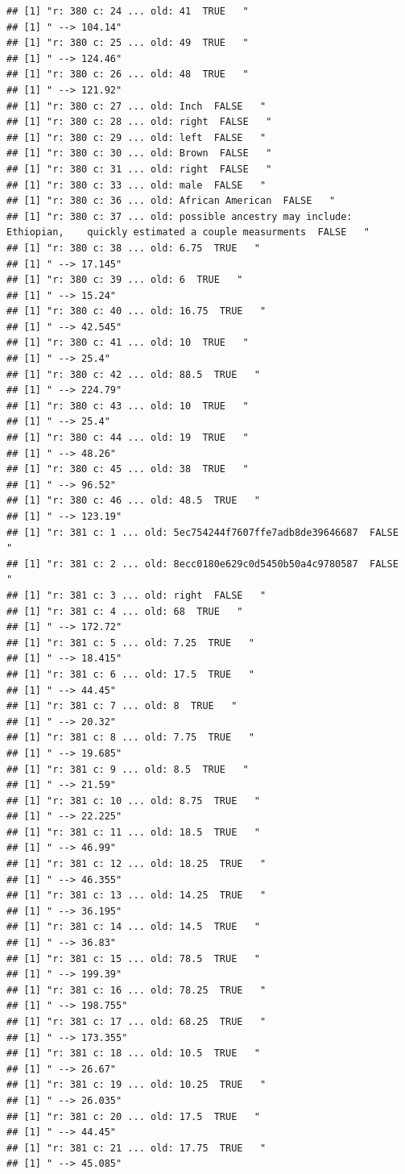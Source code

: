 \documentclass[]{article}
\begin{document}
\begin{verbatim}
## [1] "r: 380 c: 24 ... old: 41  TRUE   "
## [1] " --> 104.14"
## [1] "r: 380 c: 25 ... old: 49  TRUE   "
## [1] " --> 124.46"
## [1] "r: 380 c: 26 ... old: 48  TRUE   "
## [1] " --> 121.92"
## [1] "r: 380 c: 27 ... old: Inch  FALSE   "
## [1] "r: 380 c: 28 ... old: right  FALSE   "
## [1] "r: 380 c: 29 ... old: left  FALSE   "
## [1] "r: 380 c: 30 ... old: Brown  FALSE   "
## [1] "r: 380 c: 31 ... old: right  FALSE   "
## [1] "r: 380 c: 33 ... old: male  FALSE   "
## [1] "r: 380 c: 36 ... old: African American  FALSE   "
## [1] "r: 380 c: 37 ... old: possible ancestry may include: Ethiopian,    quickly estimated a couple measurments  FALSE   "
## [1] "r: 380 c: 38 ... old: 6.75  TRUE   "
## [1] " --> 17.145"
## [1] "r: 380 c: 39 ... old: 6  TRUE   "
## [1] " --> 15.24"
## [1] "r: 380 c: 40 ... old: 16.75  TRUE   "
## [1] " --> 42.545"
## [1] "r: 380 c: 41 ... old: 10  TRUE   "
## [1] " --> 25.4"
## [1] "r: 380 c: 42 ... old: 88.5  TRUE   "
## [1] " --> 224.79"
## [1] "r: 380 c: 43 ... old: 10  TRUE   "
## [1] " --> 25.4"
## [1] "r: 380 c: 44 ... old: 19  TRUE   "
## [1] " --> 48.26"
## [1] "r: 380 c: 45 ... old: 38  TRUE   "
## [1] " --> 96.52"
## [1] "r: 380 c: 46 ... old: 48.5  TRUE   "
## [1] " --> 123.19"
## [1] "r: 381 c: 1 ... old: 5ec754244f7607ffe7adb8de39646687  FALSE   "
## [1] "r: 381 c: 2 ... old: 8ecc0180e629c0d5450b50a4c9780587  FALSE   "
## [1] "r: 381 c: 3 ... old: right  FALSE   "
## [1] "r: 381 c: 4 ... old: 68  TRUE   "
## [1] " --> 172.72"
## [1] "r: 381 c: 5 ... old: 7.25  TRUE   "
## [1] " --> 18.415"
## [1] "r: 381 c: 6 ... old: 17.5  TRUE   "
## [1] " --> 44.45"
## [1] "r: 381 c: 7 ... old: 8  TRUE   "
## [1] " --> 20.32"
## [1] "r: 381 c: 8 ... old: 7.75  TRUE   "
## [1] " --> 19.685"
## [1] "r: 381 c: 9 ... old: 8.5  TRUE   "
## [1] " --> 21.59"
## [1] "r: 381 c: 10 ... old: 8.75  TRUE   "
## [1] " --> 22.225"
## [1] "r: 381 c: 11 ... old: 18.5  TRUE   "
## [1] " --> 46.99"
## [1] "r: 381 c: 12 ... old: 18.25  TRUE   "
## [1] " --> 46.355"
## [1] "r: 381 c: 13 ... old: 14.25  TRUE   "
## [1] " --> 36.195"
## [1] "r: 381 c: 14 ... old: 14.5  TRUE   "
## [1] " --> 36.83"
## [1] "r: 381 c: 15 ... old: 78.5  TRUE   "
## [1] " --> 199.39"
## [1] "r: 381 c: 16 ... old: 78.25  TRUE   "
## [1] " --> 198.755"
## [1] "r: 381 c: 17 ... old: 68.25  TRUE   "
## [1] " --> 173.355"
## [1] "r: 381 c: 18 ... old: 10.5  TRUE   "
## [1] " --> 26.67"
## [1] "r: 381 c: 19 ... old: 10.25  TRUE   "
## [1] " --> 26.035"
## [1] "r: 381 c: 20 ... old: 17.5  TRUE   "
## [1] " --> 44.45"
## [1] "r: 381 c: 21 ... old: 17.75  TRUE   "
## [1] " --> 45.085"

\end{verbatim}
\end{document}
